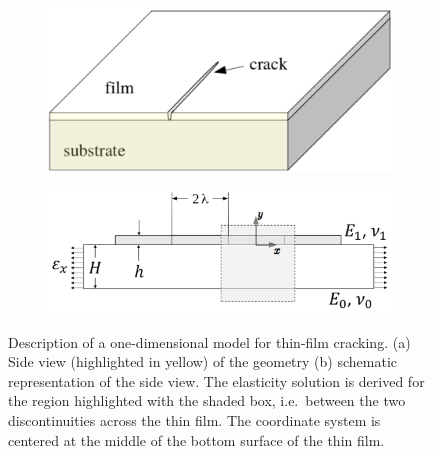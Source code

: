 \begin{figure}
  \centering
  \begin{subfigure}[b]{0.35\textwidth}
    \includegraphics[width=\textwidth,scale=0.5]{Chapter4/figures/1D/side_view.png}
    \caption{}
  \end{subfigure}
  \begin{subfigure}[b]{0.45\textwidth}
    \includegraphics[width=\textwidth,scale=0.5]{Chapter4/figures/1D/1D_schematic.png}
    \caption{}
    \label{fig: Chapter4/1D/schematic}
  \end{subfigure}
  \caption[Description of a one-dimensional model for thin-film cracking.]{Description of a one-dimensional model for thin-film cracking.  (a) Side view  (highlighted in yellow) of the geometry (b) schematic representation of the side view. The elasticity solution is derived for the region highlighted with the shaded box, i.e.\ between the two discontinuities across the thin film. The coordinate system is centered at the middle of the bottom surface of the thin film. }
  \label{fig: Chapter4/1D/simplification}
\end{figure}
